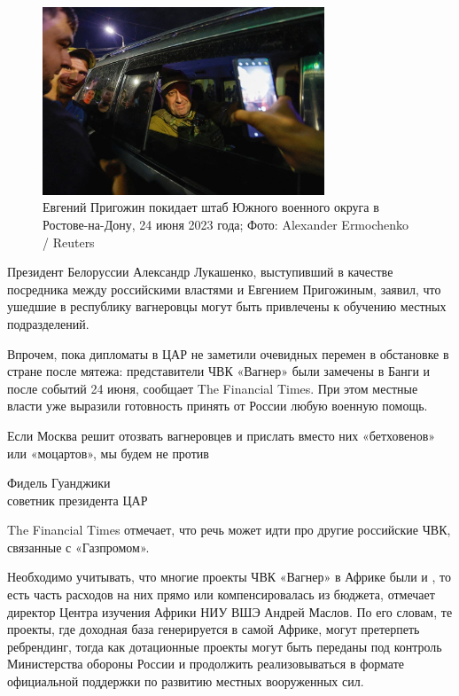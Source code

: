 \begin{figure}[h]
    \centering
    \includegraphics[width=0.75\textwidth]{img/pmc_africa_3.jpg}
    \caption{Евгений Пригожин покидает штаб Южного военного округа в Ростове-на-Дону, 24 июня 2023 года; Фото: Alexander Ermochenko / Reuters}
\end{figure}

Президент Белоруссии Александр Лукашенко, выступивший в качестве посредника между российскими властями и Евгением Пригожиным, заявил, что ушедшие в республику вагнеровцы могут быть привлечены к обучению местных подразделений.

Впрочем, пока дипломаты в ЦАР не заметили очевидных перемен в обстановке в стране после мятежа: представители ЧВК «Вагнер» были замечены в Банги и после событий 24 июня, сообщает The Financial Times. При этом местные власти уже выразили готовность принять от России любую военную помощь.

\begin{fancyquotes}
    Если Москва решит отозвать вагнеровцев и прислать вместо них «бетховенов» или «моцартов», мы будем не против

    \begin{flushright}
        Фидель Гуанджики\\
        советник президента ЦАР
    \end{flushright}
\end{fancyquotes}

The Financial Times отмечает, что речь может идти про другие российские ЧВК,  связанные с «Газпромом».

Необходимо учитывать, что многие проекты ЧВК «Вагнер» в Африке были  и , то есть часть расходов на них прямо или  компенсировалась из бюджета, отмечает директор Центра изучения Африки НИУ ВШЭ Андрей Маслов. По его словам, те проекты, где доходная база генерируется в самой Африке, могут претерпеть ребрендинг, тогда как дотационные проекты могут быть переданы под контроль Министерства обороны России и продолжить реализовываться в формате официальной поддержки по развитию местных вооруженных сил.

